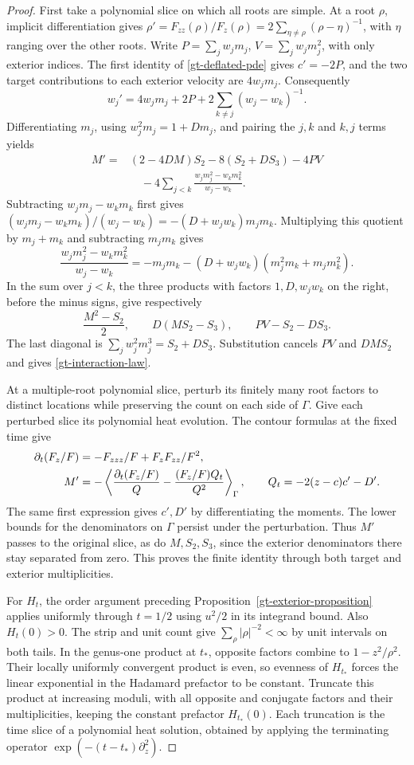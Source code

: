 \begin{proof}
First take a polynomial slice on which all roots are simple.
At a root \(\rho\), implicit differentiation gives
\(\rho'=F_{zz}(\rho)/F_z(\rho)=2\sum_{\eta\ne \rho}
(\rho-\eta)^{-1}\), with \(\eta\) ranging over the other roots.
Write \(P=\sum_j w_jm_j\), \(V=\sum_j w_jm_j^2\), with only
exterior indices. The first identity of \eqref{gt-deflated-pde}
gives \(c'=-2P\), and the two target contributions to each exterior
velocity are \(4w_jm_j\). Consequently
\[
 w_j'=4w_jm_j+2P+2\sum_{k\ne j}(w_j-w_k)^{-1}.
\]
Differentiating \(m_j\), using \(w_j^2m_j=1+Dm_j\), and
pairing the \(j,k\) and \(k,j\) terms yields
\begin{align*}
 M'={}&(2-4DM)S_2-8(S_2+DS_3)-4PV\\
       &\quad-4\sum_{j<k}
          \frac{w_jm_j^2-w_km_k^2}{w_j-w_k}.
\end{align*}
Subtracting \(w_jm_j-w_km_k\) first gives
\((w_jm_j-w_km_k)/(w_j-w_k)=-(D+w_jw_k)m_jm_k\).
Multiplying this quotient by \(m_j+m_k\) and subtracting \(m_jm_k\)
gives
\[
 \frac{w_jm_j^2-w_km_k^2}{w_j-w_k}
 =-m_jm_k-(D+w_jw_k)(m_j^2m_k+m_jm_k^2).
\]
In the sum over \(j<k\), the three products with factors \(1,D,w_jw_k\)
on the right, before the minus signs, give respectively
\[
 \frac{M^2-S_2}{2},\qquad D(MS_2-S_3),\qquad PV-S_2-DS_3 .
\]
The last diagonal is \(\sum_j w_j^2m_j^3=S_2+DS_3\).
Substitution cancels \(PV\) and \(DMS_2\) and gives
\eqref{gt-interaction-law}.

At a multiple-root polynomial slice, perturb its finitely many
root factors to distinct locations while preserving the count on
each side of \(\Gamma\). Give each perturbed slice its polynomial
heat evolution. The contour formulas at the fixed time give
\begin{align}
 \partial_t(F_z/F)&=-F_{zzz}/F+F_zF_{zz}/F^2,\notag\\
 M'&=-\left\langle
      \frac{\partial_t(F_z/F)}{Q}
        -\frac{(F_z/F)Q_t}{Q^2}
      \right\rangle_\Gamma,\qquad
 Q_t=-2(z-c)c'-D'.
 \label{gt-interaction-contour-derivative}
\end{align}
The same first expression gives \(c',D'\) by differentiating the
moments. The lower bounds for the denominators on \(\Gamma\)
persist under the perturbation. Thus \(M'\) passes to the original
slice, as do \(M,S_2,S_3\), since the exterior denominators there
stay separated from zero. This proves the finite identity through
both target and exterior multiplicities.

For \(H_t\), the order argument preceding
Proposition~\ref{gt-exterior-proposition} applies uniformly through
\(t=1/2\) using \(u^2/2\) in its integrand bound. Also \(H_t(0)>0\).
The strip and unit count give \(\sum_\rho|\rho|^{-2}<\infty\) by
unit intervals on both tails. In the genus-one product at \(t_*\),
opposite factors combine to \(1-z^2/\rho^2\). Their locally
uniformly convergent product is even, so evenness of \(H_{t_*}\)
forces the linear exponential in the Hadamard prefactor to be
constant. Truncate this product at increasing moduli, with all
opposite and conjugate factors and their multiplicities, keeping the
constant prefactor \(H_{t_*}(0)\). Each truncation is the time slice
of a polynomial heat solution, obtained by applying the terminating
operator \(\exp(-(t-t_*)\partial_z^2)\).


\end{proof}
